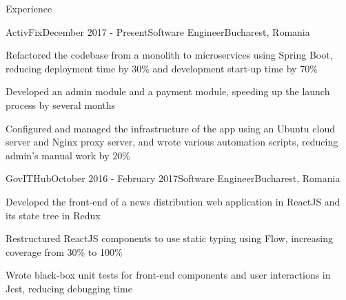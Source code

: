 \documentclass{resume} %
\begin{document}
\begin{rSection}{Experience}

\begin{rSubsection}{ActivFix}{December 2017 - Present}{Software Engineer}{Bucharest, Romania}
\item Refactored the codebase from a monolith to microservices using Spring Boot, reducing deployment time by 30\% and development start-up time by 70\%
\item Developed an admin module and a payment module, speeding up the launch process by several months
\item Configured and managed the infrastructure of the app using an Ubuntu cloud server and Nginx proxy server,  and wrote various automation scripts, reducing admin's manual work by 20\%
\end{rSubsection}


\begin{rSubsection}{GovITHub}{October 2016 - February 2017}{Software Engineer}{Bucharest, Romania}
\item Developed the front-end of a news distribution web application in ReactJS and its state tree in Redux
\item Restructured ReactJS components to use static typing using Flow, increasing coverage from 30\% to 100\%
\item Wrote black-box unit tests for front-end components and user interactions in Jest, reducing debugging time
\end{rSubsection}

\end{rSection}

\end{document}
